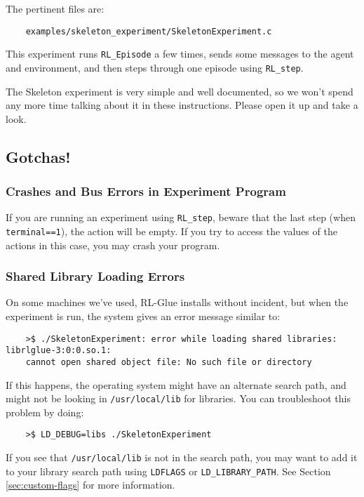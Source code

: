 \documentclass[11pt]{article}
\begin{document}
The pertinent files are:
\begin{verbatim}
	examples/skeleton_experiment/SkeletonExperiment.c
\end{verbatim}

This experiment runs \texttt{RL\_Episode} a few times, sends some messages to the agent and environment, and then steps through one episode using \texttt{RL\_step}.

The Skeleton experiment is very simple and well documented, so we won't spend any more time talking about it in these instructions.
Please open it up and take a look.



\subsection{Gotchas!}
\subsubsection{Crashes and Bus Errors in Experiment Program}
If you are running an experiment using \texttt{RL\_step}, beware that the last step (when \texttt{terminal==1}), the action will be empty.  If you try to access the values of the actions in this 
case, you may crash your program.

\subsubsection{Shared Library Loading Errors}
\label{sec:gotchas-shared-libs}
On some machines we've used, RL-Glue installs without incident, but when the experiment is run, the system gives an error message similar to:
\begin{verbatim}
	>$ ./SkeletonExperiment: error while loading shared libraries: librlglue-3:0:0.so.1:
	cannot open shared object file: No such file or directory
\end{verbatim}

If this happens, the operating system might have an alternate search path, and might not be looking in \texttt{/usr/local/lib} for libraries. 
You can troubleshoot this problem by doing:
\begin{verbatim}
	>$ LD_DEBUG=libs ./SkeletonExperiment
\end{verbatim}
If you see that \texttt{/usr/local/lib} is not in the search path, you may want to add it to your library search path using \texttt{LDFLAGS} or \texttt{LD\_LIBRARY\_PATH}.  See Section \ref{sec:custom-flags} for more information.  
\end{document}
